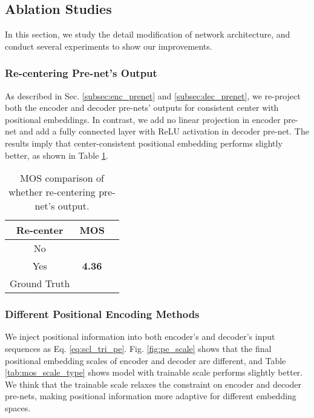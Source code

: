 \documentclass[letterpaper]{article} \usepackage{aaai19}  \usepackage{times}  \usepackage{helvet}  \usepackage{courier}  \usepackage{url}  \usepackage{graphicx}  \frenchspacing
\begin{document}
\subsection{Ablation Studies}

In this section, we study the detail modification of network architecture, and conduct several experiments to show our improvements.

\subsubsection{Re-centering Pre-net's Output}

As described in Sec. \ref{subsec:enc_prenet} and \ref{subsec:dec_prenet}, we re-project both the encoder and decoder pre-nets' outputs for consistent center with positional embeddings. In contrast, we add no linear projection in encoder pre-net and add a fully connected layer with ReLU activation in decoder pre-net. The results imply that center-consistent positional embedding performs slightly better, as shown in Table \ref{tab:mos_re_projection}.

\begin{table}[t!]
  \centering
  \begin{tabular}{ccc}
    \toprule
    Re-center    &   MOS    \\
    \midrule
    No            &                  \\
    Yes     &   \textbf{4.36}            \\
    \midrule
    Ground Truth        &           \\
    \bottomrule
  \end{tabular}
	\caption{MOS comparison of whether re-centering pre-net's output.}
  \label{tab:mos_re_projection}
\end{table}

\subsubsection{Different Positional Encoding Methods}
\label{subsubsec:pe_method}

We inject positional information into both encoder's and decoder's input sequences as Eq. \ref{eq:scl_tri_pe}. Fig. \ref{fig:pe_scale} shows that the final positional embedding scales of encoder and decoder are different, and Table \ref{tab:mos_scale_type} shows model with trainable scale performs slightly better. We think that the trainable scale relaxes the constraint on encoder and decoder pre-nets, making positional information more adaptive for different embedding spaces.
\end{document}
